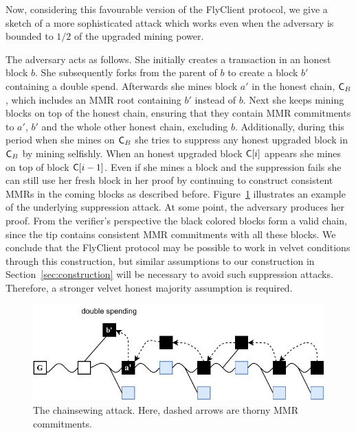 	Now, considering this favourable version of the FlyClient protocol, we give a sketch of a more sophisticated attack which works
	even when the adversary is bounded to $1/2$ of the upgraded mining power.

    The adversary acts as follows.
		She initially creates a transaction in an honest block $b$. She subsequently forks from the parent of $b$ to create a block $b'$ containing
		a double spend.
    Afterwards she mines block $a'$ in the honest chain, $\mathsf{C}_B$, which includes an MMR root containing $b'$ instead of $b$.
    Next she keeps mining blocks on top of the honest chain, ensuring that they contain MMR commitments to
		$a'$, $b'$ and the whole other honest chain, excluding $b$.
    Additionally, during this period when she mines on $\mathsf{C}_B$ she tries to suppress any honest upgraded block in $\mathsf{C}_B$ by mining selfishly.
    When an honest upgraded block $\mathsf{C}[i]$ appears she mines on top of block $\mathsf{C}[i-1]$.
    Even if she mines a block and the suppression fails she can still use her fresh block in her proof by continuing to construct consistent MMRs
    in the coming blocks as described before.
		Figure~\ref{fig:combined_chainsewing_flyclient} illustrates an example of the underlying suppression attack.
    At some point, the adversary produces her proof.
    From the verifier's perspective the black colored blocks form a valid chain,
    since the tip contains consistent MMR commitments with all these blocks.
	We conclude that the FlyClient protocol may be possible to work in velvet conditions through this construction,
	but similar assumptions to our construction in Section~\ref{sec:construction} will be necessary to avoid such suppression attacks.
	Therefore, a stronger velvet honest majority assumption is required.

	\begin{figure}
		\begin{center}
			\includegraphics[width=0.95\columnwidth]{figures/flyclient_combined_attack.pdf}
		\end{center}
		\caption{The chainsewing attack. Here, dashed arrows are thorny MMR commitments.}
		\label{fig:combined_chainsewing_flyclient}
	\end{figure}
